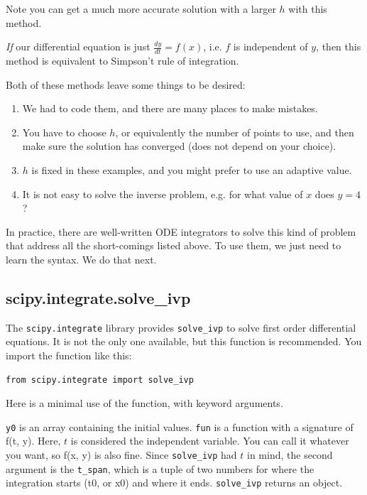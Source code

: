 \documentclass[11pt]{article}
\begin{document}
Note you can get a much more accurate solution with a larger \(h\) with this method.

\emph{If} our differential equation is just \(\frac{dy}{dt} = f(x)\), i.e. \(f\) is independent of \(y\), then this method is equivalent to Simpson't rule of integration.

Both of these methods leave some things to be desired:

\begin{enumerate}
\item We had to code them, and there are many places to make mistakes.
\item You have to choose \(h\), or equivalently the number of points to use, and then make sure the solution has converged (does not depend on your choice).
\item \(h\) is fixed in these examples, and you might prefer to use an adaptive value.
\item It is not easy to solve the inverse problem, e.g. for what value of \(x\) does \(y=4\)?
\end{enumerate}

In practice, there are well-written ODE integrators to solve this kind of problem that address all the short-comings listed above. To use them, we just need to learn the syntax. We do that next.

\subsection{scipy.integrate.solve\_ivp}
\label{sec:org5ae30b3}

The \texttt{scipy.integrate} library provides \texttt{solve\_ivp} to solve first order differential equations. It is not the only one available, but this function is recommended. You import the function like this:

\begin{verbatim}
from scipy.integrate import solve_ivp
\end{verbatim}

Here is a minimal use of the function, with keyword arguments.


\texttt{y0} is an array containing the initial values.  \texttt{fun} is a function with a signature of f(t, y). Here, \(t\) is considered the independent variable. You can call it whatever you want, so f(x, y) is also fine. Since \texttt{solve\_ivp} had \(t\) in mind, the second argument is the \texttt{t\_span}, which is a tuple of two numbers for where the integration starts (t0, or x0) and where it ends.  \texttt{solve\_ivp} returns an object.
\end{document}
